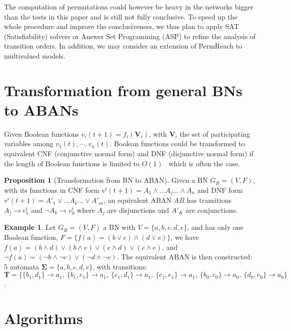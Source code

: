 \documentclass{article}
\newcommand{\acm}[3]{\{#1\}\rightarrow#3}
\theoremstyle{definition}
\newtheorem{example}{Example}
\newtheorem{proposition}{Proposition}
\begin{document}
The computation of permutations could however be heavy in the networks bigger than the tests in this paper and is still not fully conclusive. 
To speed up the whole procedure and improve the conclusiveness, we thus plan to apply SAT (Satisfiability) solvers or Answer Set Programming (ASP) to refine the analysis of transition orders. 
In addition, we may consider an extension of PermReach to multivalued models.



\appendix
\section{Transformation from general BNs to ABANs}\label{appendix:trans}

Given Boolean functions $v_i(t+1)=f_i(\mathbf{V}_i)$, with $\mathbf{V}_i$ the set of participating variables among $v_1(t),\cdots,v_n(t)$.
Boolean functions could be transformed to equivalent CNF (conjunctive normal form) and DNF (disjunctive normal form) if the length of Boolean functions is limited to $O(1)$~\cite{miltersen2005converting} which is often the case.
\begin{proposition}[Transformation from BN to ABAN]
Given a BN $G_B=(V,F)$, with its functions in CNF form $v^i(t+1)=A_1\land\ldots A_j \ldots\land A_n$ and DNF form $v^i(t+1)=A'_1\lor\ldots A_k\ldots\lor A'_m$, an equivalent ABAN $AB$ has transitions $A_j\to v^i_1$ and $\lnot A_k\to v^i_0$ where $A_j$ are disjunctions and $A'_K$ are conjunctions.
\end{proposition}
\begin{example}
Let $G_B=(V,F)$ a BN with $V=\{a,b,c,d,e\}$, and has only one Boolean function, $F=\{f(a)= (b\lor c)\land(d\lor e)\}$, we have 
$f(a)=(b\land d)\lor(b\land e)\lor(c\land d)\lor(c\land e)$, and $\lnot f(a)=(\lnot b\land \lnot c)\lor(\lnot d\land \lnot e)$. 
The equivalent ABAN is then constructed: 5 automata $\mathbf{\Sigma}=\{a,b,c,d,e\}$, with transitions: $\mathbf{T}=\{\acm{b_1,d_1}{a_0}{a_1},\ \acm{b_1,e_1}{a_0}{a_1},\ \acm{c_1,d_1}{a_0}{a_1},\ \acm{c_1,e_1}{a_0}{a_1},\ \acm{b_0,c_0}{a_1}{a_0},\ \acm{d_0,e_0}{a_1}{a_0}\}$.
\end{example}

\section{Algorithms}\label{appendix:algo}
\end{document}
